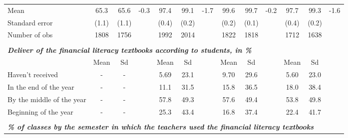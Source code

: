 \documentclass[
	article,			%
	12pt,				%
	oneside,			%
	a4paper,			%
	]{article}
\begin{document}
\begin{table}[h!]
\begin{tabular}{lcccccccccccc}
      Mean &       65.3 &       65.6 &       -0.3 &       97.4 &       99.1 &    -1.7 &       99.6 &       99.7 &       -0.2 &       97.7 &       99.3 &    -1.6 \\

Standard error &      (1.1) &      (1.1) &            &      (0.4) &      (0.2) &            &      (0.2) &      (0.1) &            &      (0.4) &      (0.2) &            \\

Number of obs &       1808 &       1756 &            &       1992 &       2014 &            &       1822 &       1818 &            &       1712 &       1638 &            \\


           &            &            &            &            &            &            &            &            &            &            &            &            \\
\hline
                                                            \multicolumn{ 13}{l}{{\it {\bf Deliver of the financial literacy textbooks according to students, in \%}}} \\

{\it {\bf }} &       Mean &         Sd &            &       Mean &         Sd &            &       Mean &         Sd &            &       Mean &         Sd \\

Haven’t received &          - &          - &            &       5.69 &       23.1 &            &       9.70 &       29.6 &            &       5.60 &       23.0 \\

In the end of the year &          - &          - &            &       11.1 &       31.5 &            &       15.8 &       36.5 &            &       18.0 &       38.4 \\

By the middle of the year &          - &          - &            &       57.8 &       49.3 &            &       57.6 &       49.4 &            &       53.8 &       49.8 \\

Beginning of the year &          - &          - &            &       25.3 &       43.4 &            &       16.8 &       37.4 &            &       22.4 &       41.7 \\

        

           &            &            &            &            &            &            &            &            &            &            &            &            \\
\hline
                                           \multicolumn{ 13}{l}{{\it {\bf \% of classes by the semester in which the teachers used the financial literacy textbooks}}} \\


\end{tabular}
\end{table}
\end{document}
